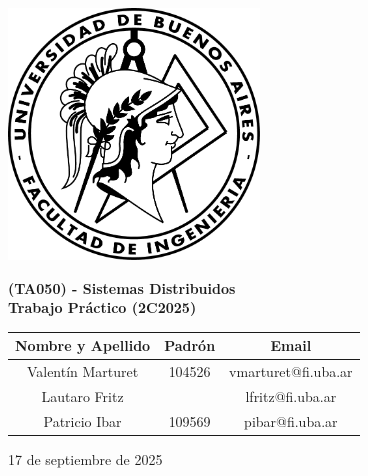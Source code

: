 \documentclass{article}
\begin{document}
    
    
    \begin{center}
        \includegraphics[width=0.5\textwidth]
        {imagenes/Logo-fiuba.png}

        \vspace{1cm}
        {\LARGE \textbf{(TA050) - Sistemas Distribuidos}} \\
        \vspace{1cm}
        {\LARGE \textbf{Trabajo Práctico (2C2025)}} \\
        \vspace{1cm}
        \begin{table}[h]
            \centering
            \begin{tabular}{c c c}
                \hline
                \textbf{Nombre y Apellido} & \textbf{Padrón} & \textbf{Email} \\ \hline
                Valentín Marturet & 104526 & vmarturet@fi.uba.ar \\
                Lautaro Fritz &  & lfritz@fi.uba.ar \\
                Patricio Ibar & 109569 & pibar@fi.uba.ar \\
                \hline
            \end{tabular}
        \end{table}

        \vspace{1cm}

        17 de septiembre de 2025

    \end{center}

    \newpage

    \tableofcontents
    \newpage

    
    

    \newpage

    
\end{document}

